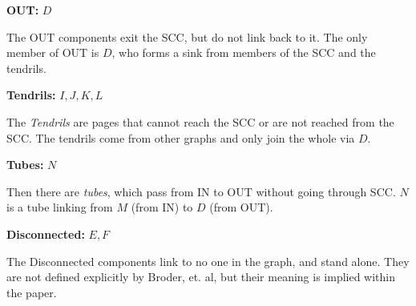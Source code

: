 \documentclass[letterpaper,11pt]{article}
\begin{document}
\textbf{OUT:}  $D$

The OUT components exit the SCC, but do not link back to it\cite{broder2000}.  The only member of OUT is $D$, who forms a sink from members of the SCC and the tendrils.

\textbf{Tendrils:}  $I, J, K, L$

The \emph{Tendrils} are pages that cannot reach the SCC or are not reached from the SCC\cite{broder2000}.  The tendrils come from other graphs and only join the whole via $D$.

\textbf{Tubes:} $N$

Then there are \emph{tubes}, which pass from IN to OUT without going through SCC\cite{broder2000}.  $N$ is a tube linking from $M$ (from IN) to $D$ (from OUT).

\textbf{Disconnected:}  $E, F$

The Disconnected components link to no one in the graph, and stand alone.  They are not defined explicitly by Broder, et. al, but their meaning is implied within the paper.

\newpage


\end{document}
